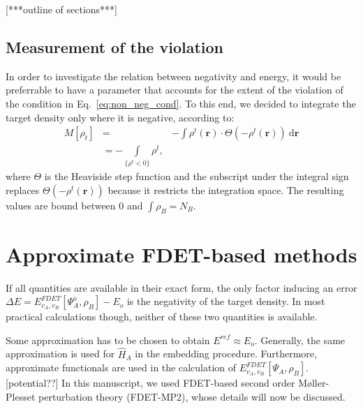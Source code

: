 \documentclass[journal=jctcce,manuscript=article, layout=twocolumn]{achemso}
\newcommand{\nr}[1]{\color{red}#1\color{black}}
\begin{document}
\nr{[***outline of sections***]}
\subsection{Measurement of the violation}
In order to investigate the relation between negativity and energy, it would be preferrable to have a parameter that accounts for the extent of the violation of the condition in Eq.~\ref{eq:non_neg_cond}. 
To this end, we decided to integrate the target density only where it is negative, according to:
\begin{align}\label{eq:M}
  M[\rho_{t}] & = & -\int \rho^{t}(\mathbf{r})\cdot \Theta(-\rho^{t}(\mathbf{r})) \ \mathrm{d}\mathbf{r} \\ \nonumber
  & = -\int \limits_{\{\rho^t < 0\}} \rho^{t},
  \end{align}
where $\Theta$ is the Heaviside step function and the subscript under the integral sign replaces $\Theta(-\rho^{t}(\mathbf{r}))$ because it restricts the integration space. The resulting values are bound between 0 and $\int \rho_B = N_B$.
\section{Approximate FDET-based methods}\label{sect:FDET_approx}
If all quantities are available in their exact form, the only factor inducing an error $\Delta E = E_{v_A,v_B}^{FDET}[\Psi^{o}_{A},\rho_B] - E_o$ is the negativity of the target density. 
In most practical calculations though, neither of these two quantities is available.

Some approximation has to be chosen to obtain $E^{ref} \approx E_o$. Generally, the same approximation is used for $\hat{H}_A$ in the embedding procedure.
Furthermore, approximate functionals are used in the calculation of $E_{v_A,v_B}^{FDET}[\Psi_{A},\rho_B]$. \nr{[potential??]}
In this manuscript, we used FDET-based second order M{\o}ller-Plesset perturbation theory (FDET-MP2), whose details will now be discussed.
\end{document}
